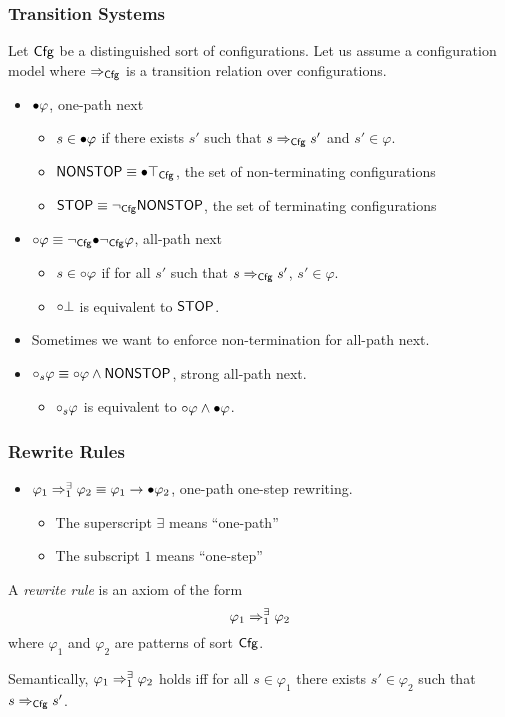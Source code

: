 \documentclass{beamer}
\begin{document}
\begin{frame}
\frametitle{Transition Systems}
Let $\mathsf{Cfg}$ be a distinguished sort of configurations.
Let us assume a configuration model
where $\Rightarrow_{\mathsf{Cfg}}$ is a transition relation over configurations.
\begin{itemize}
\item $\mathord{\bullet} \varphi$, one-path next\\
\begin{itemize}
\item $s \in \mathord{\bullet}\varphi$ if there exists $s'$ such that
      $s \Rightarrow_{\mathsf{Cfg}} s'$ and $s' \in \varphi$.
\item $\mathsf{NONSTOP} \equiv \mathord{\bullet} \top_{\mathsf{Cfg}}$,
      the set of non-terminating configurations
\item $\mathsf{STOP} \equiv \neg_{\mathsf{Cfg}} \mathsf{NONSTOP}$,
      the set of terminating configurations
\end{itemize}
\item $\mathord{\circ} \varphi \equiv \neg_{\mathsf{Cfg}} \mathord{\bullet} \neg_{\mathsf{Cfg}} \varphi$, all-path next
\begin{itemize}
\item $s \in \mathord{\circ} \varphi$ if for all $s'$ such that
      $s \Rightarrow_{\mathsf{Cfg}} s'$, $s' \in \varphi$.
\item $\mathord{\circ} \bot$ is equivalent to $\mathsf{STOP}$.
\end{itemize}
\item Sometimes we want to enforce non-termination for all-path next.
\item $\mathord{\circ}_s \varphi \equiv \mathord{\circ} \varphi \land \mathsf{NONSTOP}$,
      strong all-path next.
\begin{itemize}
\item $\mathord{\circ}_s \varphi$ is equivalent to $\mathord{\circ} \varphi \land \mathord{\bullet} \varphi$.
\end{itemize}
\end{itemize}
\end{frame}

\begin{frame}
\frametitle{Rewrite Rules}
\begin{itemize}
\item $\varphi_1 \Rightarrow^{\exists}_{1} \varphi_2 \equiv \varphi_1 \rightarrow \mathord{\bullet} \varphi_2$,
one-path one-step rewriting.
\begin{itemize}
\item The superscript $\exists$ means ``one-path''
\item The subscript $1$ means ``one-step''
\end{itemize}
\end{itemize}
A \emph{rewrite rule} is an axiom of the form
\[\varphi_1 \Rightarrow^{\exists}_{1} \varphi_2\]
where $\varphi_1$ and $\varphi_2$ are patterns of sort $\mathsf{Cfg}$.

Semantically, $\varphi_1 \Rightarrow^{\exists}_{1} \varphi_2$ holds
iff for all $s \in \varphi_1$ there exists $s' \in \varphi_2$ 
such that $s \Rightarrow_{\mathsf{Cfg}} s'$.
\end{frame}
\end{document}
